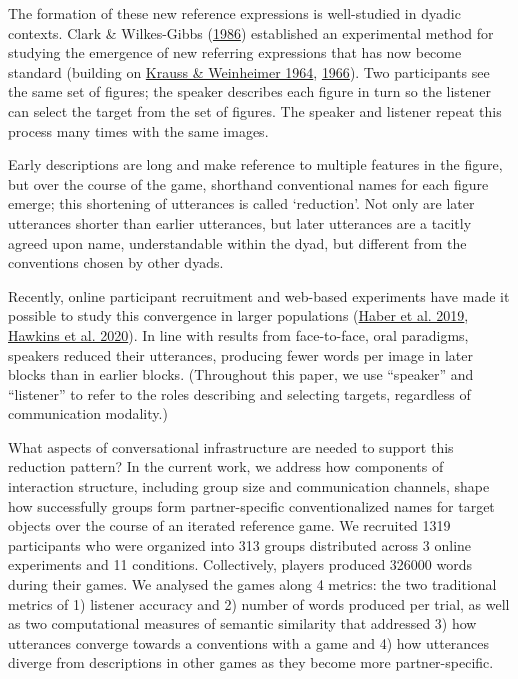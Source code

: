 \documentclass[
  english,
  a4paper,
]{article}
\begin{document}
The formation of these new reference expressions is well-studied in dyadic contexts. Clark \& Wilkes-Gibbs (\protect\hyperlink{ref-clarkReferringCollaborativeProcess1986}{1986}) established an experimental method for studying the emergence of new referring expressions that has now become standard (building on \protect\hyperlink{ref-kraussChangesReferencePhrases1964}{Krauss \& Weinheimer 1964}, \protect\hyperlink{ref-kraussConcurrentFeedbackConfirmation1966}{1966}). Two participants see the same set of figures; the speaker describes each figure in turn so the listener can select the target from the set of figures. The speaker and listener repeat this process many times with the same images.

Early descriptions are long and make reference to multiple features in the figure, but over the course of the game, shorthand conventional names for each figure emerge; this shortening of utterances is called `reduction'. Not only are later utterances shorter than earlier utterances, but later utterances are a tacitly agreed upon name, understandable within the dyad, but different from the conventions chosen by other dyads.

Recently, online participant recruitment and web-based experiments have made it possible to study this convergence in larger populations (\protect\hyperlink{ref-haber2019}{Haber et al. 2019}, \protect\hyperlink{ref-hawkinsCharacterizingDynamicsLearning2020}{Hawkins et al. 2020}). In line with results from face-to-face, oral paradigms, speakers reduced their utterances, producing fewer words per image in later blocks than in earlier blocks. (Throughout this paper, we use ``speaker'' and ``listener'' to refer to the roles describing and selecting targets, regardless of communication modality.)

What aspects of conversational infrastructure are needed to support this reduction pattern? In the current work, we address how components of interaction structure, including group size and communication channels, shape how successfully groups form partner-specific conventionalized names for target objects over the course of an iterated reference game. We recruited 1319 participants who were organized into 313 groups distributed across 3 online experiments and 11 conditions. Collectively, players produced 326000 words during their games. We analysed the games along 4 metrics: the two traditional metrics of 1) listener accuracy and 2) number of words produced per trial, as well as two computational measures of semantic similarity that addressed 3) how utterances converge towards a conventions with a game and 4) how utterances diverge from descriptions in other games as they become more partner-specific.
\end{document}
